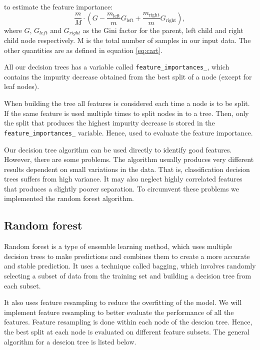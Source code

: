 to estimate the feature importance: 
\begin{equation*}
    \frac{m}{M} \cdot (G  - \frac{m_{\text{left}} }{m} G_{\text{left}}+
    \frac{m_{\text{right}} }{m} G_{\text{right}}), 
\end{equation*}
where $G$, $G_{left} $ and $G_{right} $ as the Gini factor for the parent,
left child and right child node respectively. M is the total number of samples
in our input data. The other quantities are as defined in equation
\ref{eq:cart}. 

All our decision trees has a variable called \verb|feature_importances_|, which
contains the impurity decrease obtained from the best split of a node (except
for leaf nodes).   

When building the tree all features is considered each time a node is to be
split. If the same feature is used multiple times to split nodes in to a tree.
Then, only the split that produces the highest impurity decrease is stored in
the \verb|feature_importances_| variable. Hence, used to evaluate the feature
importance.      



Our decision tree algorithm can be used directly to identify good features.
However, there are some problems. The algorithm usually produces very different
results dependent on small variations in the data. That is, classification
decision trees suffers from high variance. It may also neglect highly
correlated features that produces a slightly poorer separation. To circumvent
these problems we implemented the random forest algorithm. 

\subsection{Random forest}
Random forest is a type of ensemble learning method, which uses multiple
decision trees to make predictions and combines them to create a more accurate
and stable prediction. It uses a technique called bagging, which involves
randomly selecting a subset of data from the training set and building a
decision tree from each subset. 

It also uses feature resampling to reduce the
overfitting of the model. We will implement feature resampling
to better evaluate the performance of all the features. Feature resampling is
done within each node of the descion tree. Hence, the best split at each node is
evaluated on different feature subsets. The general algorithm for a descion
tree is listed below. 

